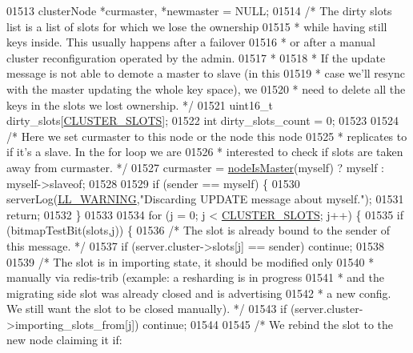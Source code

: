 \begin{DoxyCode}
{{{{{{{{{{{{{{{{{{{{{01513     clusterNode *curmaster, *newmaster = NULL;
01514     \textcolor{comment}{/* The dirty slots list is a list of slots for which we lose the ownership}
01515 \textcolor{comment}{     * while having still keys inside. This usually happens after a failover}
01516 \textcolor{comment}{     * or after a manual cluster reconfiguration operated by the admin.}
01517 \textcolor{comment}{     *}
01518 \textcolor{comment}{     * If the update message is not able to demote a master to slave (in this}
01519 \textcolor{comment}{     * case we'll resync with the master updating the whole key space), we}
01520 \textcolor{comment}{     * need to delete all the keys in the slots we lost ownership. */}
01521     uint16\_t dirty\_slots[\hyperlink{cluster_8h_aa3e2cb951eebb16725ecc3f5beefd9fd}{CLUSTER\_SLOTS}];
01522     \textcolor{keywordtype}{int} dirty\_slots\_count = 0;
01523 
01524     \textcolor{comment}{/* Here we set curmaster to this node or the node this node}
01525 \textcolor{comment}{     * replicates to if it's a slave. In the for loop we are}
01526 \textcolor{comment}{     * interested to check if slots are taken away from curmaster. */}
01527     curmaster = \hyperlink{cluster_8h_a2d8e84269474d8750565fb3fb67aa436}{nodeIsMaster}(myself) ? myself : myself->slaveof;
01528 
01529     \textcolor{keywordflow}{if} (sender == myself) \{
01530         serverLog(\hyperlink{server_8h_a31229b9334bba7d6be2a72970967a14b}{LL\_WARNING},\textcolor{stringliteral}{"Discarding UPDATE message about myself."});
01531         \textcolor{keywordflow}{return};
01532     \}
01533 
01534     \textcolor{keywordflow}{for} (j = 0; j < \hyperlink{cluster_8h_aa3e2cb951eebb16725ecc3f5beefd9fd}{CLUSTER\_SLOTS}; j++) \{
01535         \textcolor{keywordflow}{if} (bitmapTestBit(slots,j)) \{
01536             \textcolor{comment}{/* The slot is already bound to the sender of this message. */}
01537             \textcolor{keywordflow}{if} (server.cluster->slots[j] == sender) \textcolor{keywordflow}{continue};
01538 
01539             \textcolor{comment}{/* The slot is in importing state, it should be modified only}
01540 \textcolor{comment}{             * manually via redis-trib (example: a resharding is in progress}
01541 \textcolor{comment}{             * and the migrating side slot was already closed and is advertising}
01542 \textcolor{comment}{             * a new config. We still want the slot to be closed manually). */}
01543             \textcolor{keywordflow}{if} (server.cluster->importing\_slots\_from[j]) \textcolor{keywordflow}{continue};
01544 
01545             \textcolor{comment}{/* We rebind the slot to the new node claiming it if:}
}}}}}}}}}}}}}}}}}}}}}
\end{DoxyCode}
